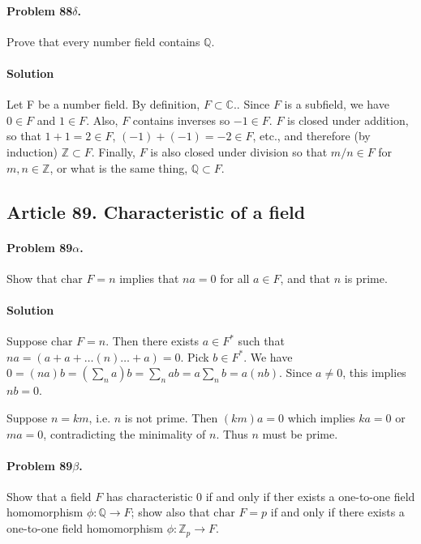 \paragraph{Problem 88$\delta$.}
Prove that every number field contains $\mathbb{Q}$.

\paragraph{Solution}
Let F be a number field. By definition, $ F \subset \mathbb{C} $.. Since $F$ is
a subfield, we have $ 0 \in F $ and $ 1 \in F $. Also, $F$ contains inverses
so $ -1 \in F $. $F$ is closed under addition, so that $ 1 + 1 = 2 \in F $,
$(-1) + (-1) = -2 \in F$, etc., and therefore (by induction) $\mathbb{Z} \subset F$.
Finally, $F$ is also closed under division so that $m/n \in F$ for $m, n \in
\mathbb{Z}$, or what is the same thing, $ \mathbb{Q} \subset F $.

\subsection{Article 89. Characteristic of a field}

\paragraph{Problem 89$\alpha$.}
Show that $\mbox{char } F = n$ implies that $na=0$ for all $a \in F$, and that
$n$ is prime.

\paragraph*{Solution}
Suppose $\mbox{char } F = n$. Then there exists $a \in F^*$ such that
$na = (a + a + \dots (n) \dots + a) = 0$. Pick $b \in F^*$. We have
$0 = (na)b = (\sum_n a)b = \sum_n ab = a \sum_n b = a(nb)$. Since $a \neq 0$, this
implies $nb = 0$.

Suppose $n = km$, i.e. $n$ is not prime. Then $(km)a = 0$ which implies $ka = 0$
or $ma = 0$, contradicting the minimality of $n$. Thus $n$ must be prime.

\paragraph{Problem 89$\beta$.}
Show that a field $F$ has characteristic $0$ if and only if ther exists a
one-to-one field homomorphism $\phi : \mathbb{Q} \rightarrow F$; show also
that $\mbox{char } F = p$ if and only if there exists a one-to-one field
homomorphism $\phi : \mathbb{Z}_p \rightarrow F$.

